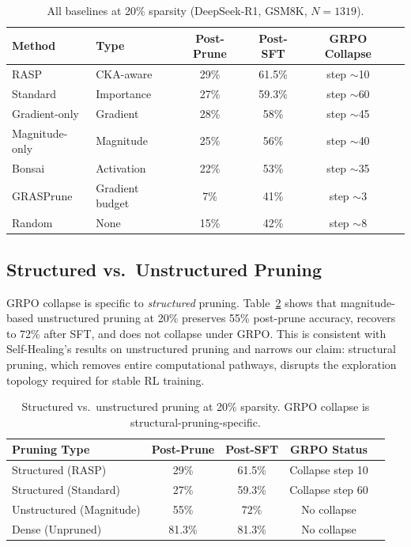 \documentclass[11pt]{article}
\begin{document}
\begin{table}[t]
\centering
\caption{All baselines at 20\% sparsity (DeepSeek-R1, GSM8K, $N{=}1319$).}
\label{tab:all_baselines}
\begin{tabular}{llcccc}
\toprule
\textbf{Method} & \textbf{Type} & \textbf{Post-Prune} & \textbf{Post-SFT} & \textbf{GRPO Collapse} \\
\midrule
RASP         & CKA-aware       & 29\% & 61.5\% & step ${\sim}$10 \\
Standard     & Importance      & 27\% & 59.3\% & step ${\sim}$60 \\
Gradient-only & Gradient       & 28\% & 58\%   & step ${\sim}$45 \\
Magnitude-only & Magnitude     & 25\% & 56\%   & step ${\sim}$40 \\
Bonsai       & Activation      & 22\% & 53\%   & step ${\sim}$35 \\
GRASPrune    & Gradient budget & 7\%  & 41\%   & step ${\sim}$3 \\
Random       & None            & 15\% & 42\%   & step ${\sim}$8 \\
\bottomrule
\end{tabular}
\end{table}

\subsection{Structured vs.\ Unstructured Pruning}
\label{sec:struct_vs_unstruct}

GRPO collapse is specific to \emph{structured} pruning.
Table~\ref{tab:struct_unstruct} shows that magnitude-based unstructured pruning at 20\% preserves 55\% post-prune accuracy, recovers to 72\% after SFT, and does not collapse under GRPO.
This is consistent with Self-Healing's results on unstructured pruning and narrows our claim: structural pruning, which removes entire computational pathways, disrupts the exploration topology required for stable RL training.

\begin{table}[t]
\centering
\caption{Structured vs.\ unstructured pruning at 20\% sparsity. GRPO collapse is structural-pruning-specific.}
\label{tab:struct_unstruct}
\begin{tabular}{lcccc}
\toprule
\textbf{Pruning Type} & \textbf{Post-Prune} & \textbf{Post-SFT} & \textbf{GRPO Status} \\
\midrule
Structured (RASP)        & 29\%  & 61.5\% & Collapse step 10 \\
Structured (Standard)    & 27\%  & 59.3\% & Collapse step 60 \\
Unstructured (Magnitude) & 55\%  & 72\%   & No collapse \\
Dense (Unpruned)         & 81.3\% & 81.3\% & No collapse \\
\bottomrule
\end{tabular}
\end{table}
\end{document}

